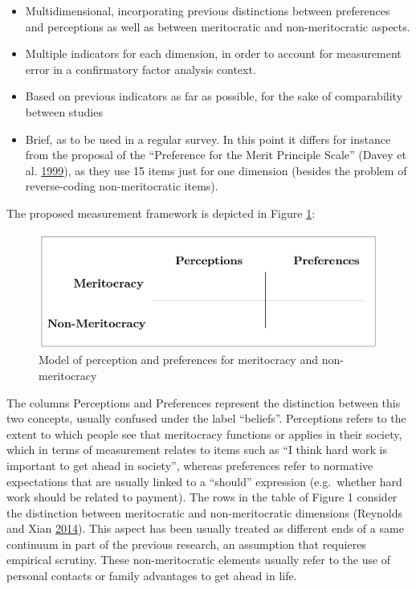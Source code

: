 \documentclass[
]{article}
\begin{document}
\begin{itemize}
\item
  Multidimensional, incorporating previous distinctions between preferences and perceptions as well as between meritocratic and non-meritocratic aspects.
\item
  Multiple indicators for each dimension, in order to account for measurement error in a confirmatory factor analysis context.
\item
  Based on previous indicators as far as possible, for the sake of comparability between studies
\item
  Brief, as to be used in a regular survey. In this point it differs for instance from the proposal of the ``Preference for the Merit Principle Scale'' (Davey et al. \protect\hyperlink{ref-davey_preference_1999}{1999}), as they use 15 items just for one dimension (besides the problem of reverse-coding non-meritocratic items).
\end{itemize}

The proposed measurement framework is depicted in Figure \ref{fig:merit-model}:

\begin{figure}[H]

{\centering \includegraphics[width=0.75\linewidth]{../input/images/generalf} 

}

\caption{Model of perception and preferences for meritocracy and non-meritocracy}\label{fig:merit-model}
\end{figure}

The columns Perceptions and Preferences represent the distinction between this two concepts, usually confused under the label ``beliefs''. Perceptions refers to the extent to which people see that meritocracy functions or applies in their society, which in terms of measurement relates to items such as ``I think hard work is important to get ahead in society'', whereas preferences refer to normative expectations that are usually linked to a ``should'' expression (e.g.~whether hard work should be related to payment). The rows in the table of Figure 1 consider the distinction between meritocratic and non-meritocratic dimensions (Reynolds and Xian \protect\hyperlink{ref-reynolds_perceptions_2014}{2014}). This aspect has been usually treated as different ends of a same continuum in part of the previous research, an assumption that requieres empirical scrutiny. These non-meritocratic elements usually refer to the use of personal contacts or family advantages to get ahead in life.
\end{document}
